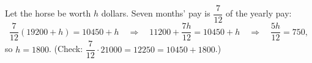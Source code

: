 Let the horse be worth $h$ dollars. Seven months' pay is $\dfrac{7}{12}$ of the yearly pay:
\[
\dfrac{7}{12}(19200+h)=10450+h\quad\Longrightarrow\quad 11200+\dfrac{7h}{12}=10450+h\quad\Longrightarrow\quad \dfrac{5h}{12}=750 ,
\]
so $h=\boxed{1800}$. (Check: $\dfrac{7}{12}\cdot21000=12250=10450+1800$.)
